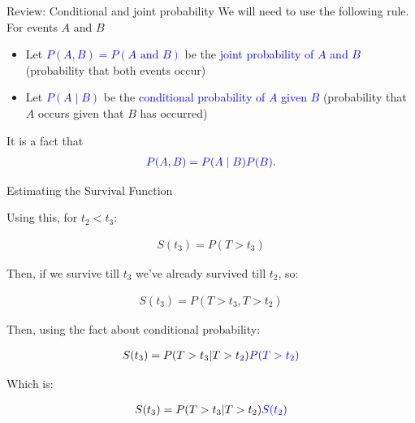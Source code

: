 \documentclass[10pt,t]{beamer}
\begin{document}
\begin{frame}{Review: Conditional and joint probability}
	We will need to use the following rule. For events $A$ and $B$
	\begin{itemize}
		\item Let \textcolor{blue}{$P(A, B) = P(A \text{ and } B)$} be the \textcolor{blue}{joint probability of $A$ and $B$} (probability that both events occur)
		
		\medskip
		
		\item Let \textcolor{blue}{$P(A \mid B)$} be the \textcolor{blue}{conditional probability of $A$ given $B$} (probability that $A$ occurs given that $B$ has occurred)
	\end{itemize}

\bigskip

	It is a fact that
	\begin{align*}
		\textcolor{blue}{P(A, B) = P(A \mid B)P(B).}
	\end{align*}
\end{frame}

\begin{frame}{Estimating the Survival Function}
	
	Using this, for $t_2<t_3$:
	
	\begin{align*}
	S(t_3)=P(T>t_3)
	\end{align*}
	
	Then, if we survive till $t_3$ we've already survived till $t_2$, so:
	
		\begin{align*}
	S(t_3)=P(T>t_3,T > t_2)
	\end{align*}
	
	Then, using the fact about conditional probability:
	
	\begin{align*}
	S(t_3)=P(T>t_3|T>t_2)\textcolor{blue}{P(T>t_2)}
	\end{align*}
	
	
	Which is:
	
		\begin{align*}
	S(t_3)=P(T>t_3|T>t_2)\textcolor{blue}{S(t_2)}
	\end{align*}
	
\end{frame}
\end{document}
